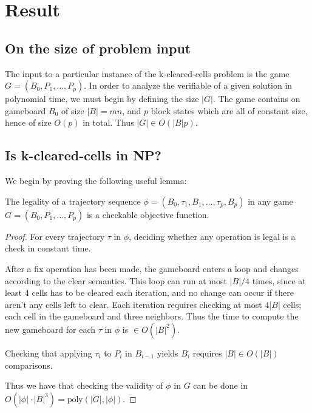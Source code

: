 \section{Result}

\subsection{On the size of problem input}
The input to a particular instance of the k-cleared-cells problem is the game $G = (B_0, P_1, \ldots, P_p)$. In order to analyze the verifiable of a given solution in polynomial time, we must begin by defining the size $|G|$. The game contains on gameboard $B_0$ of size $|B| = mn$, and $p$ block states which are all of constant size, hence of size $O(p)$ in total. Thus $|G| \in O(|B|p)$.

\subsection{Is k-cleared-cells in NP?}

We begin by proving the following useful lemma:\\

\begin{lem}
\label{lem:legality}
The legality of a trajectory sequence $\phi=(B_0, \tau_1, B_1, \ldots ,\tau_p, B_p)$ in any game $G=(B_0, P_1, \ldots, P_p)$ is a checkable objective function.
\end{lem}

\begin{proof}
For every trajectory $\tau$ in $\phi$, deciding whether any operation is legal is a check in constant time.

After a fix operation has been made, the gameboard enters a loop and changes according to the clear semantics. This loop can run at most $|B| / 4$ times, since at least 4 cells has to be cleared each iteration, and no change can occur if there aren't any cells left to clear. Each iteration requires checking at most $4|B|$ cells; each cell in the gameboard and three neighbors. Thus the time to compute the new gameboard for each $\tau$ in $\phi$ is $\in O(|B|^2)$.

Checking that applying $\tau_i$ to $P_i$ in $B_{i-1}$ yields $B_i$ requires $|B| \in O(|B|)$ comparisons. 

Thus we have that checking the validity of $\phi$ in $G$ can be done in $O(|\phi| \cdot |B|^3) = \text{poly}(|G|, |\phi|)$. 
\end{proof}


